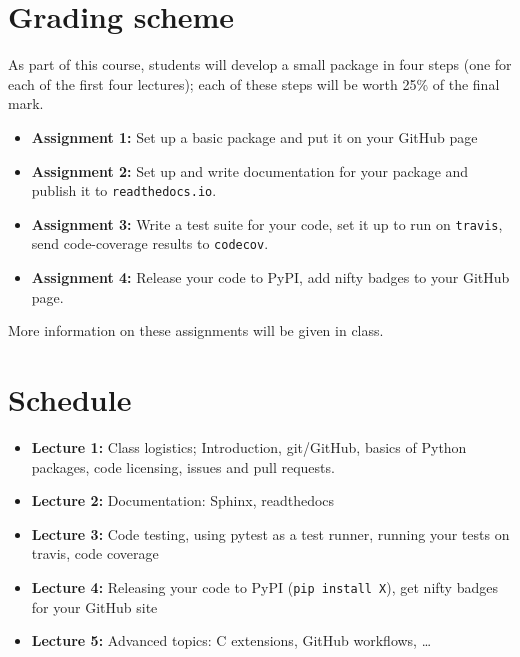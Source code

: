 \documentclass{article}
\begin{document}
\section*{Grading scheme}

As part of this course, students will develop a small package in four
steps (one for each of the first four lectures); each of these steps
will be worth 25\% of the final mark.

\begin{itemize}

  \item {\bf Assignment 1:} Set up a basic package and put it on your GitHub page

  \item {\bf Assignment 2:} Set up and write documentation for your package and publish it to \texttt{readthedocs.io}.

  \item {\bf Assignment 3:} Write a test suite for your code, set it
    up to run on \texttt{travis}, send code-coverage results to
    \texttt{codecov}.

  \item {\bf Assignment 4:} Release your code to PyPI, add nifty
    badges to your GitHub page.

\end{itemize}

More information on these assignments will be given in class.

\section*{Schedule}

\begin{itemize}

  \item {\bf Lecture 1:} Class logistics; Introduction, git/GitHub,
    basics of Python packages, code licensing, issues and pull
    requests.

  \item {\bf Lecture 2:} Documentation: Sphinx, readthedocs

  \item {\bf Lecture 3:} Code testing, using pytest as a test runner,
    running your tests on travis, code coverage

  \item {\bf Lecture 4:} Releasing your code to PyPI (\texttt{pip install
    X}), get nifty badges for your GitHub site

  \item {\bf Lecture 5:} Advanced topics: C extensions, GitHub workflows, \ldots

\end{itemize}
\end{document}
